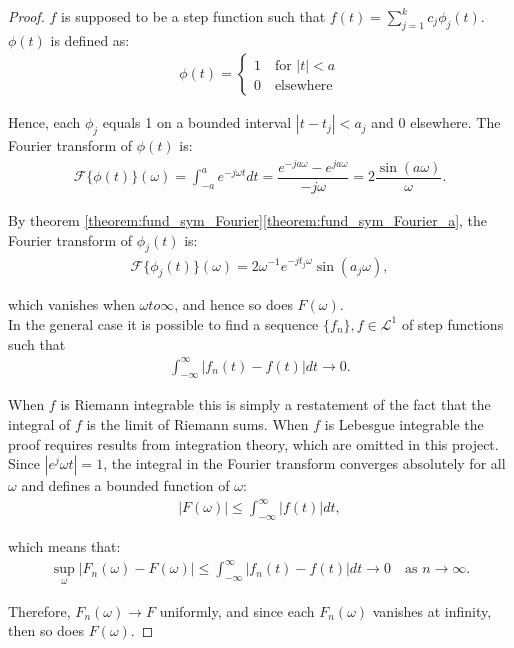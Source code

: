 \begin{proof}
$f$ is supposed to be a step function such that $f(t) = \sum_{j=1}^k c_j \phi_j(t)$. $\phi(t)$ is defined as:
\begin{align*}
\phi(t) =
	\begin{cases}
		1 \quad \text{for } |t| < a \\
		0 \quad \text{elsewhere}
	\end{cases}
\end{align*}

Hence, each $\phi_j$ equals 1 on a bounded interval $|t - t_j| < a_j$ and 0 elsewhere. The Fourier transform of $\phi(t)$ is:
\begin{align*}
\mathcal{F}\{\phi(t)\}(\omega) = \int_{-a}^a e^{-j\omega t} dt = \dfrac{e^{-ja\omega} - e^{ja\omega}}{-j\omega} = 2\dfrac{\sin(a\omega)}{\omega}.
\end{align*}

By theorem \ref{theorem:fund_sym_Fourier}\ref{theorem:fund_sym_Fourier_a}, the Fourier transform of $\phi_j(t)$ is:
\begin{align*}
\mathcal{F}\{\phi_j(t)\}(\omega) = 2 \omega^{-1} e^{-jt_j\omega} \sin(a_j\omega),
\end{align*}

which vanishes when $\omega to \infty$, and hence so does $F(\omega)$.
\\
In the general case it is possible to find a sequence $\{f_n\}, f \in \mathcal{L}^1$ of step functions such that
\begin{align*}
\int_{-\infty}^\infty |f_n(t) - f(t)| dt \to 0.
\end{align*}

When $f$ is Riemann integrable this is simply a restatement of the fact that the integral of $f$ is the limit of Riemann sums. When $f$ is Lebesgue integrable the proof requires results from integration theory, which are omitted in this project. Since $|e^j\omega t| = 1$, the integral in the Fourier transform converges absolutely for all $\omega$ and defines a bounded function of $\omega$:
\begin{align*}
|F(\omega)| \leq \int_{-\infty}^\infty |f(t)| dt,
\end{align*}

which means that:
\begin{align*}
\sup_{\omega} |F_n(\omega) - F(\omega)| \leq \int_{-\infty}^\infty |f_n(t) - f(t)| dt \to 0 \quad \text{as } n \to \infty.
\end{align*}

Therefore, $F_n(\omega) \to F$ uniformly, and since each $F_n(\omega)$ vanishes at infinity, then so does $F(\omega)$.
\end{proof}

